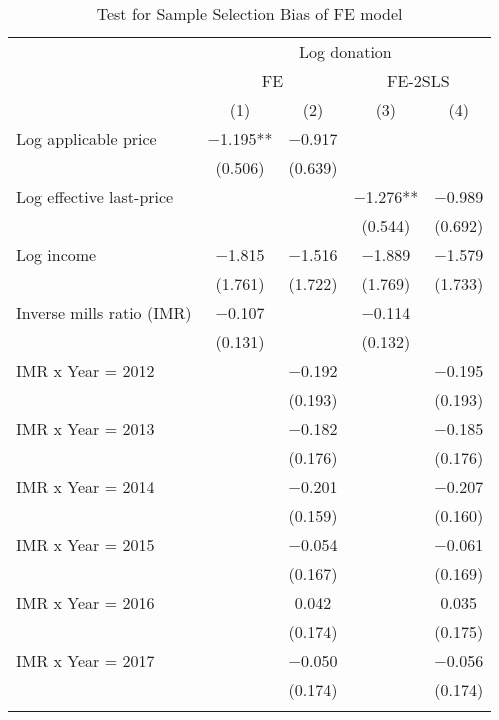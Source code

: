 \begin{table}

\caption{Test for Sample Selection Bias of FE model\label{tab:fe2sls-selection-test}}
\centering
\fontsize{8}{10}\selectfont
\begin{threeparttable}
\begin{tabular}[t]{lcccc}
\toprule
\multicolumn{1}{c}{ } & \multicolumn{4}{c}{Log donation} \\
\cmidrule(l{3pt}r{3pt}){2-5}
\multicolumn{1}{c}{ } & \multicolumn{2}{c}{FE} & \multicolumn{2}{c}{FE-2SLS} \\
\cmidrule(l{3pt}r{3pt}){2-3} \cmidrule(l{3pt}r{3pt}){4-5}
  & (1) & (2) & (3) & (4)\\
\midrule
Log applicable price & \num{-1.195}** & \num{-0.917} &  & \\
 & (\num{0.506}) & (\num{0.639}) &  & \\
Log effective last-price &  &  & \num{-1.276}** & \num{-0.989}\\
 &  &  & (\num{0.544}) & (\num{0.692})\\
Log income & \num{-1.815} & \num{-1.516} & \num{-1.889} & \num{-1.579}\\
 & (\num{1.761}) & (\num{1.722}) & (\num{1.769}) & (\num{1.733})\\
Inverse mills ratio (IMR) & \num{-0.107} &  & \num{-0.114} & \\
 & (\num{0.131}) &  & (\num{0.132}) & \\
IMR x Year = 2012 &  & \num{-0.192} &  & \num{-0.195}\\
 &  & (\num{0.193}) &  & (\num{0.193})\\
IMR x Year = 2013 &  & \num{-0.182} &  & \num{-0.185}\\
 &  & (\num{0.176}) &  & (\num{0.176})\\
IMR x Year = 2014 &  & \num{-0.201} &  & \num{-0.207}\\
 &  & (\num{0.159}) &  & (\num{0.160})\\
IMR x Year = 2015 &  & \num{-0.054} &  & \num{-0.061}\\
 &  & (\num{0.167}) &  & (\num{0.169})\\
IMR x Year = 2016 &  & \num{0.042} &  & \num{0.035}\\
 &  & (\num{0.174}) &  & (\num{0.175})\\
IMR x Year = 2017 &  & \num{-0.050} &  & \num{-0.056}\\
 &  & (\num{0.174}) &  & (\num{0.174})\\
\midrule
\addlinespace[0.3em]

\end{tabular}
\end{threeparttable}
\end{table}
